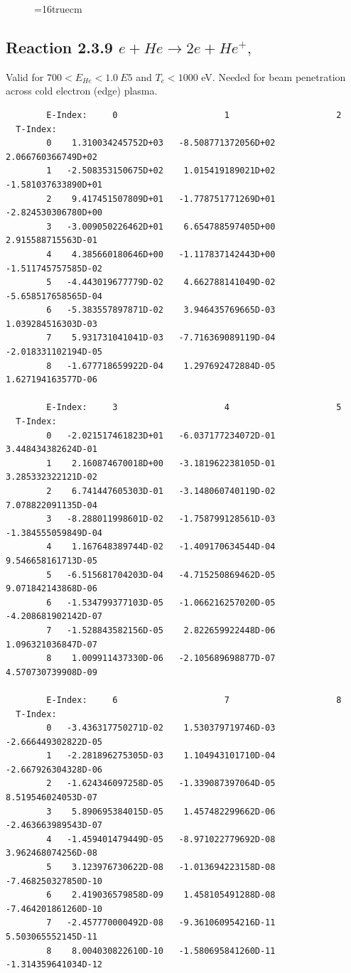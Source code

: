 \documentclass[12pt,dvips]{article}
\begin{document}
\begin{figure} \label{2.1.5H3}
\epsfxsize=16truecm
\end{figure}

\newpage
\subsection{
Reaction 2.3.9  $e + He \rightarrow 2e + He^+ ,\ $ }

Valid for $ 700 < E_{He} < 1.0~ E5$ and $T_e  < 1000$ eV.
Needed for beam penetration across cold electron (edge) plasma.

\begin{small}\begin{verbatim}
        E-Index:     0                     1                     2
  T-Index:
        0    1.310034245752D+03   -8.508771372056D+02    2.066760366749D+02
        1   -2.508353150675D+02    1.015419189021D+02   -1.581037633890D+01
        2    9.417451507809D+01   -1.778751771269D+01   -2.824530306780D+00
        3   -3.009050226462D+01    6.654788597405D+00    2.915588715563D-01
        4    4.385660180646D+00   -1.117837142443D+00   -1.511745757585D-02
        5   -4.443019677779D-02    4.662788141049D-02   -5.658517658565D-04
        6   -5.383557897871D-02    3.946435769665D-03    1.039284516303D-03
        7    5.931731041041D-03   -7.716369089119D-04   -2.018331102194D-05
        8   -1.677718659922D-04    1.297692472884D-05    1.627194163577D-06

        E-Index:     3                     4                     5
  T-Index:
        0   -2.021517461823D+01   -6.037177234072D-01    3.448434382624D-01
        1    2.160874670018D+00   -3.181962238105D-01    3.285332322121D-02
        2    6.741447605303D-01   -3.148060740119D-02    7.078822091135D-04
        3   -8.288011998601D-02   -1.758799128561D-03   -1.384555059849D-04
        4    1.167648389744D-02   -1.409170634544D-04    9.546658161713D-05
        5   -6.515681704203D-04   -4.715250869462D-05    9.071842143868D-06
        6   -1.534799377103D-05   -1.066216257020D-05   -4.208681902142D-07
        7   -1.528843582156D-05    2.822659922448D-06    1.096321036847D-07
        8    1.009911437330D-06   -2.105689698877D-07    4.570730739908D-09

        E-Index:     6                     7                     8
  T-Index:
        0   -3.436317750271D-02    1.530379719746D-03   -2.666449302822D-05
        1   -2.281896275305D-03    1.104943101710D-04   -2.667926304328D-06
        2   -1.624346097258D-05   -1.339087397064D-05    8.519546024053D-07
        3    5.890695384015D-05    1.457482299662D-06   -2.463663989543D-07
        4   -1.459401479449D-05   -8.971022779692D-08    3.962468074256D-08
        5    3.123976730622D-08   -1.013694223158D-08   -7.468250327850D-10
        6    2.419036579858D-09    1.458105491288D-08   -7.464201861260D-10
        7   -2.457770000492D-08   -9.361060954216D-11    5.503065552145D-11
        8    8.004030822610D-10   -1.580695841260D-11   -1.314359641034D-12


\end{verbatim}
\end{small}
\end{document}
